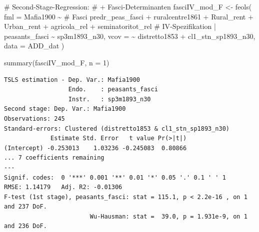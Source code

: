 \documentclass[
  a4paper,
  DIV=11,
  oneside]{scrreprt}
\newenvironment{Shaded}{\begin{snugshade}}{\end{snugshade}}
\newcommand{\AttributeTok}[1]{\textcolor[rgb]{0.40,0.45,0.13}{#1}}
\newcommand{\CommentTok}[1]{\textcolor[rgb]{0.37,0.37,0.37}{#1}}
\newcommand{\DecValTok}[1]{\textcolor[rgb]{0.68,0.00,0.00}{#1}}
\newcommand{\FunctionTok}[1]{\textcolor[rgb]{0.28,0.35,0.67}{#1}}
\newcommand{\NormalTok}[1]{\textcolor[rgb]{0.00,0.23,0.31}{#1}}
\newcommand{\OtherTok}[1]{\textcolor[rgb]{0.00,0.23,0.31}{#1}}
\newcommand{\SpecialCharTok}[1]{\textcolor[rgb]{0.37,0.37,0.37}{#1}}
\begin{document}
\begin{Shaded}
\begin{Highlighting}[]
\CommentTok{\# Second{-}Stage{-}Regression:}
\CommentTok{\# + Fasci{-}Determinanten}
\NormalTok{fasciIV\_mod\_F }\OtherTok{\textless{}{-}} \FunctionTok{feols}\NormalTok{(}
  \AttributeTok{fml =}\NormalTok{ Mafia1900 }\SpecialCharTok{\textasciitilde{}} 
  \CommentTok{\# Fasci}
\NormalTok{  predr\_peas\_fasci}
  \SpecialCharTok{+}\NormalTok{ ruralcentre1861}
  \SpecialCharTok{+}\NormalTok{ Rural\_rent}
  \SpecialCharTok{+}\NormalTok{ Urban\_rent}
  \SpecialCharTok{+}\NormalTok{ agricola\_rel}
  \SpecialCharTok{+}\NormalTok{ seminatoritot\_rel}
  \CommentTok{\# IV{-}Spezifikation}
  \SpecialCharTok{|}\NormalTok{ peasants\_fasci }\SpecialCharTok{\textasciitilde{}}\NormalTok{ sp3m1893\_n30,}
  \AttributeTok{vcov =} \SpecialCharTok{\textasciitilde{}}\NormalTok{ distretto1853 }\SpecialCharTok{+}\NormalTok{ cl1\_stn\_sp1893\_n30,}
  \AttributeTok{data =}\NormalTok{ ADD\_dat}
\NormalTok{) }

\FunctionTok{summary}\NormalTok{(fasciIV\_mod\_F, }\AttributeTok{n =} \DecValTok{1}\NormalTok{)}
\end{Highlighting}
\end{Shaded}

\begin{verbatim}
TSLS estimation - Dep. Var.: Mafia1900
                  Endo.    : peasants_fasci
                  Instr.   : sp3m1893_n30
Second stage: Dep. Var.: Mafia1900
Observations: 245
Standard-errors: Clustered (distretto1853 & cl1_stn_sp1893_n30) 
             Estimate Std. Error   t value Pr(>|t|) 
(Intercept) -0.253013    1.03236 -0.245083  0.80866 
... 7 coefficients remaining
---
Signif. codes:  0 '***' 0.001 '**' 0.01 '*' 0.05 '.' 0.1 ' ' 1
RMSE: 1.14179   Adj. R2: -0.01306
F-test (1st stage), peasants_fasci: stat = 115.1, p < 2.2e-16 , on 1 and 237 DoF.
                        Wu-Hausman: stat =  39.0, p = 1.931e-9, on 1 and 236 DoF.
\end{verbatim}
\end{document}
